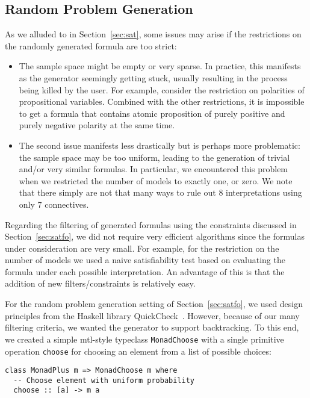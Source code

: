 \subsection{Random Problem Generation}\label{appB:SAT}

As we alluded to in Section~\ref{sec:sat},
some issues may arise if the restrictions on the randomly generated formula are too strict:
\begin{itemize}
    \item
        The sample space might be empty or very sparse.
        In practice, this manifests as the generator seemingly getting stuck,
        usually resulting in the process being killed by the user. 
        For example,
        consider the restriction on polarities of propositional
        variables. %
        Combined with the other restrictions,
        it is impossible to get a formula that contains atomic proposition
        of purely positive and purely negative polarity at the same time.

    \item
        The second issue manifests less drastically but is perhaps more problematic:
        the sample space may be too uniform,
        leading to the generation of trivial and/or very similar
        formulas. 
        In particular, we encountered this problem
        when we restricted the number of models to exactly one, or zero.
        We note that there simply are not that many ways to rule out 8 interpretations
        using only 7 connectives.
\end{itemize}





Regarding the filtering of generated formulas using the constraints discussed in Section~\ref{sec:satfo},
we did not require very efficient algorithms since
the formulas under consideration are very small.
For example, for the restriction on the number of models we used a naive satisfiability test
based on evaluating the formula under each possible interpretation.
An advantage of this is that the addition of new filters/constraints is relatively easy.




For the random problem generation setting of Section~\ref{sec:satfo},
we used design principles from the Haskell library
QuickCheck~\cite{ClaessenHughes:2000:QuickCheck}.
However, because of our many filtering criteria, we wanted the generator to support backtracking.
To this end,
we created a simple mtl-style typeclass \texttt{MonadChoose}
with a single primitive operation \texttt{choose} for choosing an element from a list of possible choices:
\begin{lstlisting}
class MonadPlus m => MonadChoose m where
  -- Choose element with uniform probability
  choose :: [a] -> m a
\end{lstlisting}

